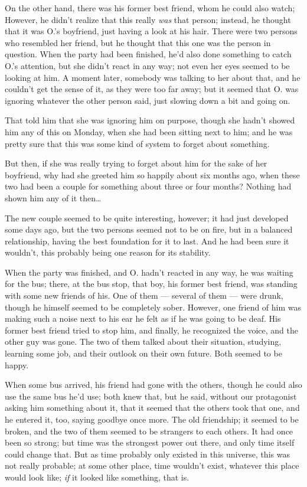 On the other hand, there was his former best friend, whom he could also watch; However, he didn't realize that this really \emph{was} that person; instead, he thought that it was O.'s boyfriend, just having a look at his hair. There were two persons who resembled her friend, but he thought that this one was the person in question. When the party had been finished, he'd also done something to catch O.'s attention, but she didn't react in any way; not even her eyes seemed to be looking at him. A moment later, somebody was talking to her about that, and he couldn't get the sense of it, as they were too far away; but it seemed that O. was ignoring whatever the other person said, just slowing down a bit and going on.

That told him that she was ignoring him on purpose, though she hadn't showed him any of this on Monday, when she had been sitting next to him; and he was pretty sure that this was some kind of system to forget about something.

But then, if she was really trying to forget about him for the sake of her boyfriend, why had she greeted him so happily about six months ago, when these two had been a couple for something about three or four months? Nothing had shown him any of it then\ldots

The new couple seemed to be quite interesting, however; it had just developed some days ago, but the two persons seemed not to be on fire, but in a balanced relationship, having the best foundation for it to last.
And he had been sure it wouldn't, this probably being one reason for its stability.

When the party was finished, and O. hadn't reacted in any way, he was waiting for the bus; there, at the bus stop, that boy, his former best friend, was standing with some new friends of his. One of them --- several of them --- were drunk, though he himself seemed to be completely sober. However, one friend of him was making such a noise next to his ear he felt as if he was going to be deaf. His former best friend tried to stop him, and finally, he recognized the voice, and the other guy was gone. The two of them talked about their situation, studying, learning some job, and their outlook on their own future. 
Both seemed to be happy.

When some bus arrived, his friend had gone with the others, though he could also use the same bus he'd use; both knew that, but he said, without our protagonist asking him something about it, that it seemed that the others took that one, and he entered it, too, saying goodbye once more. 
The old friendship; it seemed to be broken, and the two of them seemed to be strangers to each others. It had once been so strong; but time was the strongest power out there, and only time itself could change that. But as time probably only existed in this universe, this was not really probable; at some other place, time wouldn't exist, whatever this place would look like; \emph{if} it looked like something, that is.

